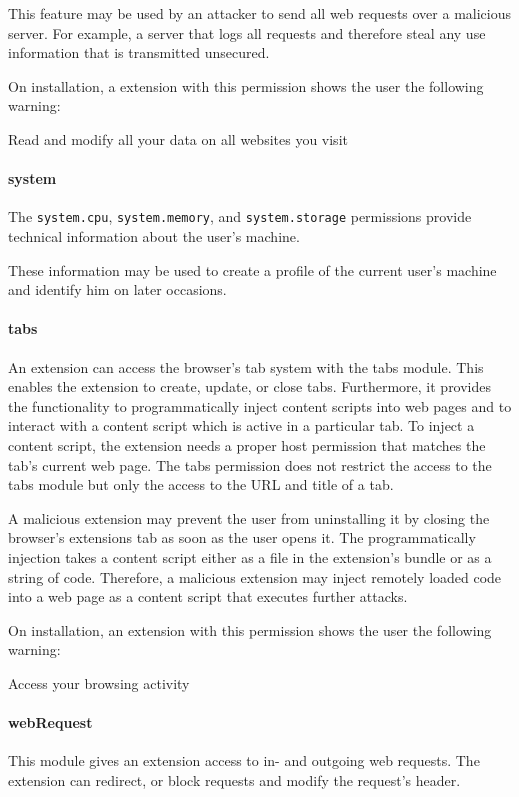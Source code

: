 	This feature may be used by an attacker to send all web requests over a malicious server. For example, a server that logs all requests and therefore steal any use information that is transmitted unsecured.
	
	On installation, a extension with this permission shows the user the following warning:
	\begin{permissionwarning}
		Read and modify all your data on all websites you visit 
	\end{permissionwarning}
	
\paragraph{system}
	The \texttt{system.cpu}, \texttt{system.memory}, and \texttt{system.storage} permissions provide technical information about the user's machine.
	
	These information may be used to create a profile of the current user's machine and identify him on later occasions.
	
\paragraph{tabs}
	An extension can access the browser's tab system with the tabs module. This enables the extension to create, update, or close tabs. Furthermore, it provides the functionality to programmatically inject content scripts into web pages and to interact with a content script which is active in a particular tab. To inject a content script, the extension needs a proper host permission that matches the tab's current web page. The tabs permission does not restrict the access to the tabs module but only the access to the URL and title of a tab. 
	
	A malicious extension may prevent the user from uninstalling it by closing the browser's extensions tab as soon as the user opens it. The programmatically injection takes a content script either as a file in the extension's bundle or as a string of code. Therefore, a malicious extension may inject remotely loaded code into a web page as a content script that executes further attacks.
	
	On installation, an extension with this permission shows the user the following warning:
	\begin{permissionwarning}
		Access your browsing activity 
	\end{permissionwarning}		
	
\paragraph{webRequest}
	This module gives an extension access to in- and outgoing web requests. The extension can redirect, or block requests and modify the request's header.
	
